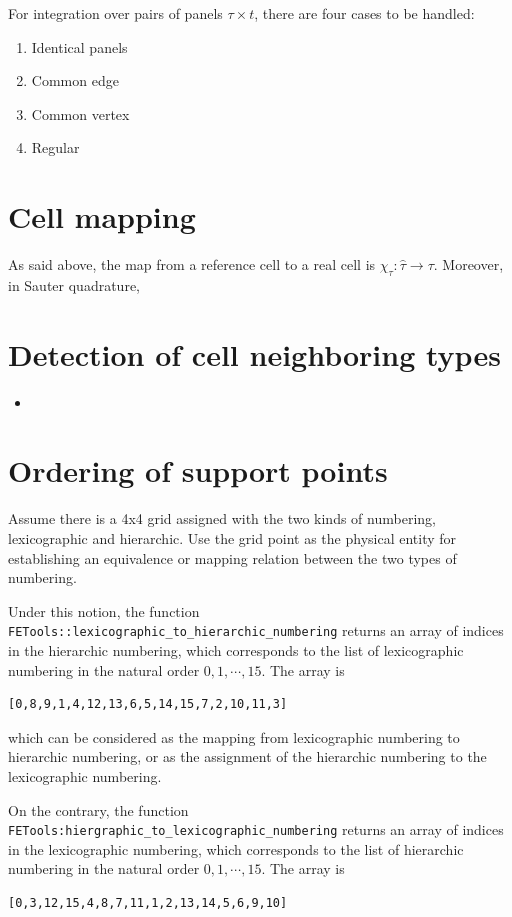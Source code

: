 \documentclass[11pt, a4paper]{book}
\begin{document}
For integration over pairs of panels $\tau\times t$, there are four cases to be handled:
\begin{enumerate}
\item Identical panels
\item Common edge
\item Common vertex
\item Regular
\end{enumerate}

\section{Cell mapping}

As said above, the map from a reference cell to a real cell is $\chi_{\tau}: \hat{\tau}
\rightarrow \tau$. Moreover, in Sauter quadrature, 


\section{Detection of cell neighboring types}

\begin{itemize}
\item 
\end{itemize}

\section{Ordering of support points}

Assume there is a 4x4 grid assigned with the two kinds of numbering, lexicographic and hierarchic. Use the grid point as the physical entity for establishing an equivalence or mapping relation between the two types of numbering.

Under this notion, the function \texttt{FETools::lexicographic\_to\_hierarchic\_numbering} returns an array of indices in the hierarchic numbering, which corresponds to the list of lexicographic numbering in the natural order \(0,1,\cdots,15\). The array is
\begin{lstlisting}[language=text]
[0,8,9,1,4,12,13,6,5,14,15,7,2,10,11,3]
\end{lstlisting}

which can be considered as the mapping from lexicographic numbering to hierarchic numbering, or as the assignment of the hierarchic numbering to the lexicographic numbering.

On the contrary, the function \texttt{FETools:hiergraphic\_to\_lexicographic\_numbering}
returns an array of indices in the lexicographic numbering, which corresponds to the list
of hierarchic numbering in the natural order \(0,1,\cdots,15\). The array is
\begin{lstlisting}[language=text]
[0,3,12,15,4,8,7,11,1,2,13,14,5,6,9,10]
\end{lstlisting}
\end{document}

